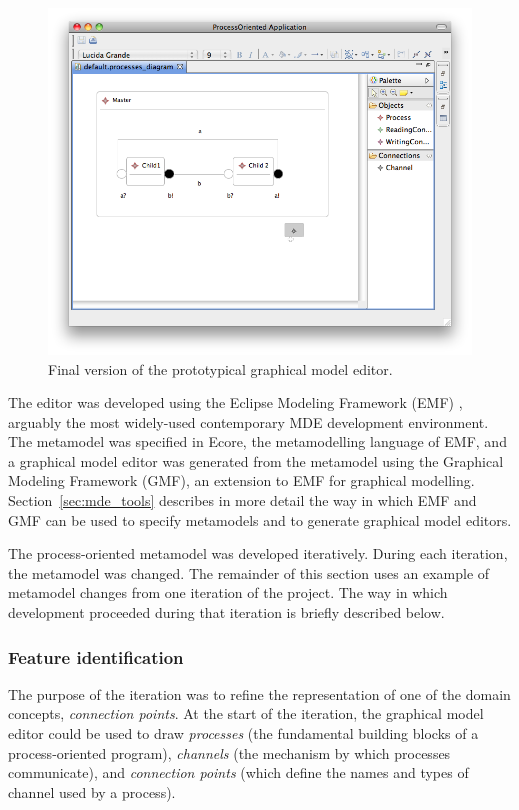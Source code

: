 \begin{figure}[htbp]
	\centering
	\includegraphics[width=13.5cm]{6.Evaluation/images/user_driven/po_final_editor.png}
	\caption{Final version of the prototypical graphical model editor.}
	\label{fig:po_final_graphical_editor}
\end{figure}


The editor was developed using the Eclipse Modeling Framework (EMF) \cite{steinberg09emf}, arguably the most widely-used contemporary MDE development environment. The metamodel was specified in Ecore, the metamodelling language of EMF, and a graphical model editor was generated from the metamodel using the Graphical Modeling Framework (GMF), an extension to EMF for graphical modelling. Section~\ref{sec:mde_tools} describes in more detail the way in which EMF and GMF can be used to specify metamodels and to generate graphical model editors.

The process-oriented metamodel was developed iteratively. During each iteration, the metamodel was changed. The remainder of this section uses an example of metamodel changes from one iteration of the project. The way in which development proceeded during that iteration is briefly described below.

\subsubsection{Feature identification}
The purpose of the iteration was to refine the representation of one of the domain concepts, \emph{connection points}. At the start of the iteration, the graphical model editor could be used to draw \emph{processes} (the fundamental building blocks of a process-oriented program), \emph{channels} (the mechanism by which processes communicate), and \emph{connection points} (which define the names and types of channel used by a process).

